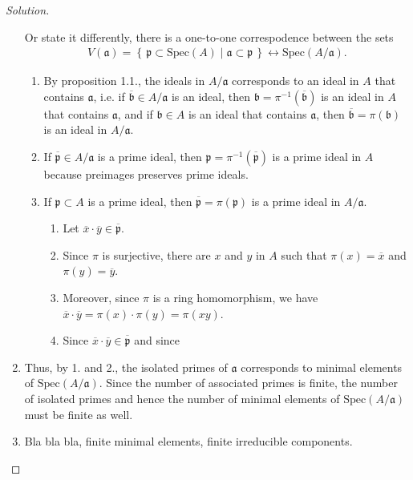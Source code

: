 \documentclass[a4paper]{book}
\theoremstyle{definition}
\newcommand{\makeset}[2]{\left\{\, #1 \mid #2 \,\right\}}
\begin{document}
\begin{proof}[Solution]
\begin{enumerate}
        Or state it differently, there is a one-to-one correspodence between the sets
        \begin{align*}
            V(\mathfrak{a}) = \makeset{\mathfrak{p} \subset \text{Spec}(A)}{\mathfrak{a} \subset \mathfrak{p}} \longleftrightarrow \text{Spec}(A / \mathfrak{a}) \text{.}
        \end{align*}
        \begin{enumerate}
            \item By proposition 1.1., the ideals in \(A / \mathfrak{a}\) corresponds to an ideal in \(A\) that contains \(\mathfrak{a}\), i.e. if \(\overline{\mathfrak{b}} \in A / \mathfrak{a}\) is an ideal, then \(\mathfrak{b} = \pi^{-1}(\overline{\mathfrak{b}})\) is an ideal in \(A\) that contains \(\mathfrak{a}\), and if \(\mathfrak{b} \in A\) is an ideal that contains \(\mathfrak{a}\), then \(\overline{\mathfrak{b}} = \pi(\mathfrak{b})\) is an ideal in \(A / \mathfrak{a}\).
            \item If \(\overline{\mathfrak{p}} \in A / \mathfrak{a}\) is a prime ideal, then \(\mathfrak{p} = \pi^{-1}(\overline{\mathfrak{p}})\) is a prime ideal in \(A\) because preimages preserves prime ideals.
            \item If \(\mathfrak{p} \subset A\) is a prime ideal, then \(\overline{\mathfrak{p}} = \pi(\mathfrak{p})\) is a prime ideal in \(A / \mathfrak{a}\).
            \begin{enumerate}
                \item Let \(\overline{x} \cdot \overline{y} \in \overline{\mathfrak{p}}\).
                \item Since \(\pi\) is surjective, there are \(x\) and \(y\) in \(A\) such that \(\pi(x) = \overline{x}\) and \(\pi(y) = \overline{y}\).
                \item Moreover, since \(\pi\) is a ring homomorphism, we have \(\overline{x} \cdot \overline{y} = \pi(x) \cdot \pi (y) = \pi(xy)\).
                \item Since \(\overline{x} \cdot \overline{y} \in \overline{\mathfrak{p}}\) and since 
            \end{enumerate}
        \end{enumerate}
        \item Thus, by 1. and 2., the isolated primes of \(\mathfrak{a}\) corresponds to minimal elements of \(\text{Spec}(A / \mathfrak{a})\). Since the number of associated primes is finite, the number of isolated primes and hence the number of minimal elements of \(\text{Spec}(A / \mathfrak{a})\) must be finite as well.
        \item Bla bla bla, finite minimal elements, finite irreducible components.
    \end{enumerate}
\end{proof}
\end{document}
